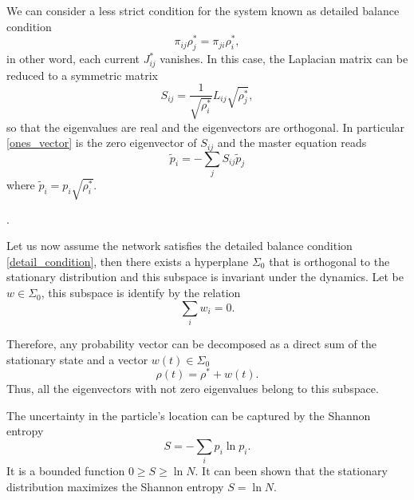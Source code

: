 We can consider a less strict condition for the system known as detailed balance condition
\begin{equation}\label{detail_condition}
    \pi_{ij} \rho_j^* = \pi_{ji} \rho_i^*,
\end{equation}
in other word, each current $J^*_{ij}$ vanishes.
In this case, the Laplacian matrix can be reduced to a symmetric matrix 
\begin{equation}
    S_{ij}=\frac{1}{\sqrt{\rho_i^\ast}}L_{ij}\sqrt{\rho_j^\ast},
\end{equation}
so that the eigenvalues are real and the eigenvectors are orthogonal. In particular \eqref{ones_vector} is the zero eigenvector of $S_{ij}$ and the master equation reads 
\begin{equation}
    \tilde p_i=-\sum_j S_{ij} \tilde p_j
\end{equation}
where $\tilde p_i=p_i\sqrt{\rho_i^\ast}$. 

.

Let us now assume the network satisfies the detailed balance condition \eqref{detail_condition}, then there exists a hyperplane $\Sigma_0$ that is orthogonal to the stationary distribution and this subspace is invariant under the dynamics. Let be $w \in \Sigma_0$, this subspace is identify by the relation
\begin{equation}
    \sum_i w_i = 0.
\end{equation}


Therefore, any probability vector can be decomposed as a direct sum of the stationary state and a vector $w(t) \in \Sigma_0$ 
\begin{equation}
    \rho(t) = \rho^* + w(t).
\end{equation}
Thus, all the eigenvectors with not zero eigenvalues belong to this subspace.


The uncertainty in the particle's location can be captured by the Shannon entropy
\begin{equation}
    S = -\sum_i p_i\ln p_i.
\end{equation}
It is a bounded function $0\geq S \geq \ln N$.
It can been shown that the stationary distribution maximizes the Shannon entropy $S = \ln N$.
    
